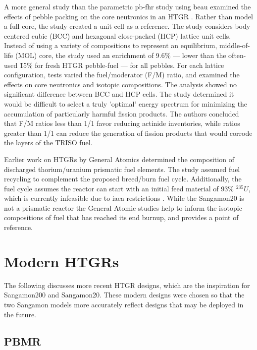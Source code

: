 A more general study than the parametric \acrshort{pb-fhr} study using \acrshort{beau} examined the effects of pebble packing on the core neutronics in an HTGR \cite{turkmen_effect_2012}.  Rather than model a full core, the study created a unit cell as a reference.  The study considers body centered cubic (BCC) and hexagonal close-packed (HCP) lattice unit cells.  Instead of using a variety of compositions to represent an equilibrium, middle-of-life (MOL) core, the study used an enrichment of 9.6\%  --- lower than the often-used \~15\% for fresh HTGR pebble-fuel --- for all pebbles.  For each lattice configuration, tests varied the fuel/moderator (F/M) ratio, and examined the effects on core neutronics and isotopic compositions.  The analysis showed no significant difference between BCC and HCP cells.  The study determined it would be difficult to select a truly 'optimal' energy spectrum for minimizing the accumulation of particularly harmful fission products.  The authors concluded that F/M ratios less than 1/1 favor reducing actinide inventories, while ratios greater than 1/1 can reduce the generation of fission products that would corrode the layers of the TRISO fuel.

Earlier work on HTGRs by General Atomics determined the composition of discharged thorium/uranium prismatic fuel elements.  The study assumed fuel recycling to complement the proposed breed/burn fuel cycle.  Additionally, the fuel cycle assumes the reactor can start with an initial feed material of 93\% $^{235}U$, which is currently infeasible due to \acrshort{iaea} restrictions \cite{hamilton_htgr_1976}.  While the Sangamon20 is not a prismatic reactor the General Atomic studies help to inform the isotopic compositions of fuel that has reached its end burnup, and provides a point of reference.


\section{Modern HTGRs}
\label{sec:modern}

The following discusses more recent HTGR designs, which are the inspiration for Sangamon200 and Sangamon20.  These modern designs were chosen so that the two Sangamon models more accurately reflect designs that may be deployed in the future.

\subsection{PBMR}

